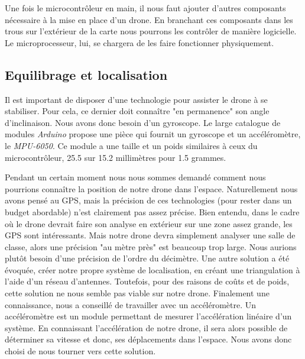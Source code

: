 \documentclass[a4paper,10pt]{report}
\begin{document}
      Une fois le microcontrôleur en main, il nous faut ajouter d'autres 
composants nécessaire à la mise en place d'un drone. En branchant ces 
composants dans les trous sur l'extérieur de la carte nous pourrons les 
contrôler de manière logicielle. Le microprocesseur, lui, se chargera de les 
faire fonctionner physiquement.  
	
      \subsection{Equilibrage et localisation}
	Il est important de disposer d'une technologie pour assister le drone à se stabiliser. Pour cela, ce dernier doit connaître
	"en permanence" son angle d'inclinaison. Nous avons donc besoin d'un gyroscope. Le large catalogue de modules \textit{Arduino}
	propose une pièce qui fournit un gyroscope et un accéléromètre, le \textit{MPU-6050}. Ce module a une taille et un poids 
	similaires à ceux du microcontrôleur, 25.5 sur 15.2 millimètres pour 1.5 grammes.
	
	Pendant un certain moment nous nous sommes demandé comment nous pourrions connaître la position de notre drone dans l'espace. 
	Naturellement nous avons pensé au GPS, mais la précision de ces technologies (pour rester dans un budget abordable) n'est clairement 
	pas assez précise. Bien entendu, dans le cadre où le drone devrait faire son analyse en extérieur sur une zone assez grande, les 
	GPS sont intéressants. Mais notre drone devra simplement analyser une salle de classe, alors une précision "au mètre près" est 
	beaucoup trop large. Nous aurions plutôt besoin d'une précision de l’ordre du décimètre.  Une autre solution a été évoquée, créer 
	notre propre système de localisation, en créant une triangulation à l’aide d’un réseau d’antennes. Toutefois, pour des raisons de 
	coûts et de poids,  cette solution ne nous semble pas viable sur notre drone. Finalement une connaissance, nous a conseillé de 
	travailler avec un accéléromètre. Un accéléromètre est un module permettant de mesurer l'accélération linéaire d’un système. 
	En connaissant l'accélération de notre drone, il sera alors possible de déterminer sa vitesse et donc, ses déplacements dans 
	l’espace. Nous avons donc choisi de nous tourner vers cette solution.
	
\end{document}
